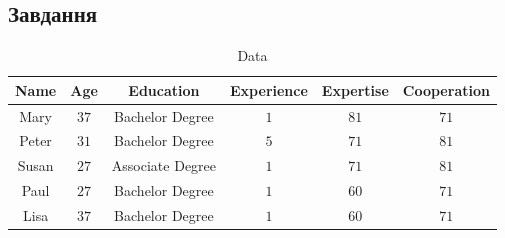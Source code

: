 \subsection{Завдання}
\label{subsec:electre1/task}

\begin{table}[!ht]
    \centering
    \caption{Data}
    \label{tab:data}

    \begin{tabular}{|c|c|c|c|c|c|}
        \toprule
        Name  & Age  & Education        & Experience & Expertise & Cooperation \\

        \midrule
        Mary  & $37$ & Bachelor Degree  & $1$        & $81$      & $71$        \\
        Peter & $31$ & Bachelor Degree  & $5$        & $71$      & $81$        \\
        Susan & $27$ & Associate Degree & $1$        & $71$      & $81$        \\
        Paul  & $27$ & Bachelor Degree  & $1$        & $60$      & $71$        \\
        Lisa  & $37$ & Bachelor Degree  & $1$        & $60$      & $71$        \\

        \bottomrule
    \end{tabular}
\end{table}

